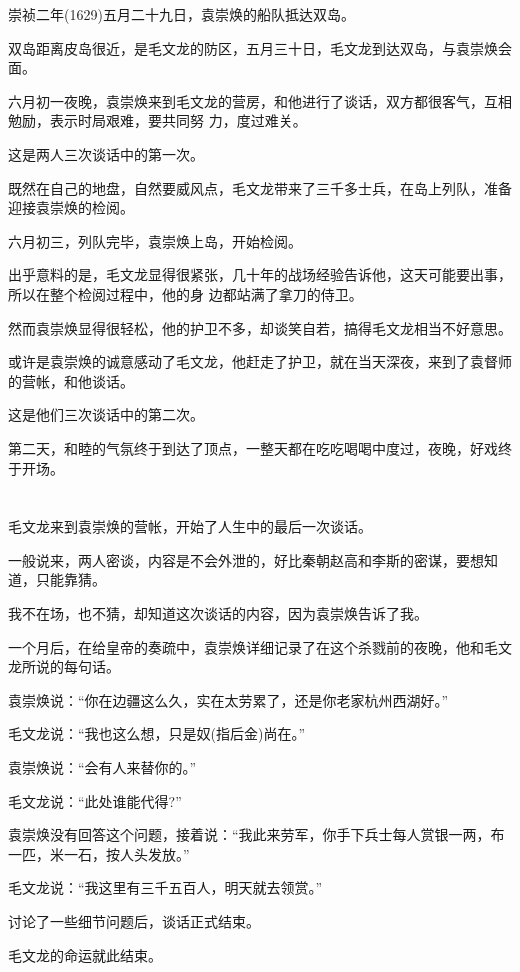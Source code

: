 \documentclass[11pt,a4paper,onecolumn]{article}
\begin{document}
崇祯二年(1629)五月二十九日，袁崇焕的船队抵达双岛。

双岛距离皮岛很近，是毛文龙的防区，五月三十日，毛文龙到达双岛，与袁崇焕会面。

六月初一夜晚，袁崇焕来到毛文龙的营房，和他进行了谈话，双方都很客气，互相勉励，表示时局艰难，要共同努
力，度过难关。

这是两人三次谈话中的第一次。

既然在自己的地盘，自然要威风点，毛文龙带来了三千多士兵，在岛上列队，准备迎接袁崇焕的检阅。

六月初三，列队完毕，袁崇焕上岛，开始检阅。

出乎意料的是，毛文龙显得很紧张，几十年的战场经验告诉他，这天可能要出事，所以在整个检阅过程中，他的身
边都站满了拿刀的侍卫。

然而袁崇焕显得很轻松，他的护卫不多，却谈笑自若，搞得毛文龙相当不好意思。

或许是袁崇焕的诚意感动了毛文龙，他赶走了护卫，就在当天深夜，来到了袁督师的营帐，和他谈话。

这是他们三次谈话中的第二次。

第二天，和睦的气氛终于到达了顶点，一整天都在吃吃喝喝中度过，夜晚，好戏终于开场。

\section[\thesection]{}

毛文龙来到袁崇焕的营帐，开始了人生中的最后一次谈话。

一般说来，两人密谈，内容是不会外泄的，好比秦朝赵高和李斯的密谋，要想知道，只能靠猜。

我不在场，也不猜，却知道这次谈话的内容，因为袁崇焕告诉了我。

一个月后，在给皇帝的奏疏中，袁崇焕详细记录了在这个杀戮前的夜晚，他和毛文龙所说的每句话。

袁崇焕说：``你在边疆这么久，实在太劳累了，还是你老家杭州西湖好。''

毛文龙说：``我也这么想，只是奴(指后金)尚在。''

袁崇焕说：``会有人来替你的。''

毛文龙说：``此处谁能代得?''

袁崇焕没有回答这个问题，接着说：``我此来劳军，你手下兵士每人赏银一两，布一匹，米一石，按人头发放。''

毛文龙说：``我这里有三千五百人，明天就去领赏。''

讨论了一些细节问题后，谈话正式结束。

毛文龙的命运就此结束。
\end{document}
